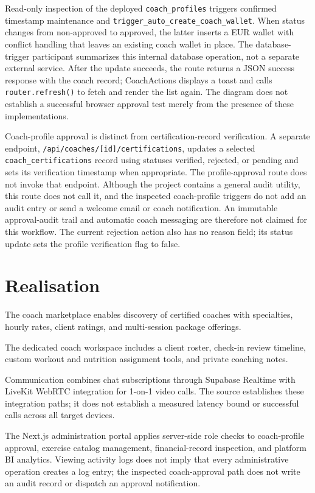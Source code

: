 \documentclass[12pt,a4paper,openany]{report}
\begin{document}
Read-only inspection of the deployed \texttt{coach\_profiles} triggers confirmed timestamp maintenance and \texttt{trigger\_auto\_create\_coach\_wallet}. When status changes from non-approved to approved, the latter inserts a EUR wallet with conflict handling that leaves an existing coach wallet in place. The database-trigger participant summarizes this internal database operation, not a separate external service. After the update succeeds, the route returns a JSON success response with the coach record; CoachActions displays a toast and calls \texttt{router.refresh()} to fetch and render the list again. The diagram does not establish a successful browser approval test merely from the presence of these implementations.

Coach-profile approval is distinct from certification-record verification. A separate endpoint, \texttt{/api/coaches/[id]/certifications}, updates a selected \texttt{coach\_certifications} record using statuses verified, rejected, or pending and sets its verification timestamp when appropriate. The profile-approval route does not invoke that endpoint. Although the project contains a general audit utility, this route does not call it, and the inspected coach-profile triggers do not add an audit entry or send a welcome email or coach notification. An immutable approval-audit trail and automatic coach messaging are therefore not claimed for this workflow. The current rejection action also has no reason field; its status update sets the profile verification flag to false.


\section{Realisation}

The coach marketplace enables discovery of certified coaches with specialties, hourly rates, client ratings, and multi-session package offerings.


The dedicated coach workspace includes a client roster, check-in review timeline, custom workout and nutrition assignment tools, and private coaching notes.


Communication combines chat subscriptions through Supabase Realtime with LiveKit WebRTC integration for 1-on-1 video calls. The source establishes these integration paths; it does not establish a measured latency bound or successful calls across all target devices.


The Next.js administration portal applies server-side role checks to coach-profile approval, exercise catalog management, financial-record inspection, and platform BI analytics. Viewing activity logs does not imply that every administrative operation creates a log entry; the inspected coach-approval path does not write an audit record or dispatch an approval notification.
\end{document}
